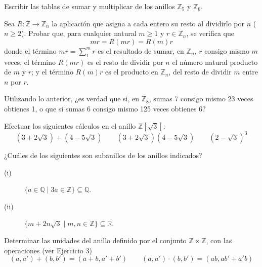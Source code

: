 \begin{ejercicio}
    Escribir las tablas de sumar y multiplicar de los anillos $\mathbb{Z}_5$ y $\mathbb{Z}_6$.
\end{ejercicio}

\begin{ejercicio}
    Sea $R:\mathbb{Z}\to \mathbb{Z}_n$ la aplicación que asigna a cada entero su resto al dividirlo por $n$ ($n\geq 2$). Probar que, para cualquier natural $m\geq 1$ y $r\in \mathbb{Z}_n$, se verifica que
    \begin{equation*}
        mr = R(mr) = R(m)r
    \end{equation*}
    donde el término $mr=\sum_1^m r$ es el resultado de sumar, en $\mathbb{Z}_n$, $r$ consigo mismo $m$ veces, el término $R(mr)$ es el resto de dividir por $n$ el número natural producto de $m$ y $r$; y el término $R(m)r$ es el producto en $\mathbb{Z}_n$, del resto de dividir $m$ entre $n$ por $r$.

    Utilizando lo anterior, ¿es verdad que si, en $\mathbb{Z}_8$, sumas 7 consigo mismo 23 veces obtienes 1, o que si sumas 6 consigo mismo 125 veces obtienes 6?
\end{ejercicio}

\begin{ejercicio}
    Efectuar los siguientes cálculos en el anillo $\mathbb{Z}\left[\sqrt{3}\right]$:
    \begin{equation*}
        (3+2\sqrt{3})+(4-5\sqrt{3})\qquad (3+2\sqrt{3})(4-5\sqrt{3})\qquad {(2-\sqrt{3})}^{3}
    \end{equation*}
\end{ejercicio}

\begin{ejercicio}
    ¿Cuáles de los siguientes son subanillos de los anillos indicados?
    \begin{description}
        \item [(i)] $\{a\in \mathbb{Q}\mid 3a\in \mathbb{Z}\} \subseteq \mathbb{Q}$.
        \item [(ii)] $\{m + 2n\sqrt{3}\mid m,n \in \mathbb{Z}\} \subseteq \mathbb{R}$.
    \end{description}
\end{ejercicio}

\begin{ejercicio}
    Determinar las unidades del anillo definido por el conjunto $\mathbb{Z}\times \mathbb{Z}$, con las operaciones (ver Ejercicio 3)
    \begin{equation*}
        (a,a') + (b,b') = (a+b, a'+b')\qquad (a,a')\cdot (b,b') = (ab, ab'+a'b)
    \end{equation*}
\end{ejercicio}

